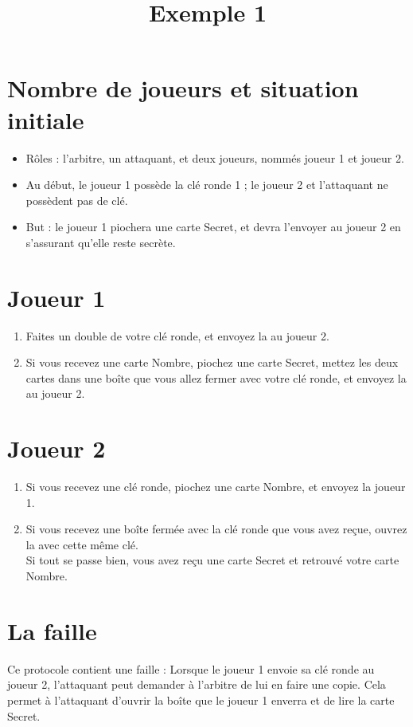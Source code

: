 \documentclass[a4paper,10pt]{article}
\title{Exemple 1}
\begin{document}
\maketitle

\section{Nombre de joueurs et situation initiale}
\begin{itemize}
	\item Rôles : l'arbitre, un attaquant, et deux joueurs, nommés joueur 1 et joueur 2.
	\item Au début, le joueur 1 possède la clé ronde 1 ; le joueur 2 et l'attaquant ne possèdent pas de clé.
	\item But : le joueur 1 piochera une carte Secret, et devra l'envoyer au joueur 2 en s'assurant qu'elle reste secrète.
\end{itemize}




\section{Joueur 1}
\begin{enumerate}
	\item Faites un double de votre clé ronde, et envoyez la au joueur 2.
	\item Si vous recevez une carte Nombre, piochez une carte Secret, mettez les deux cartes dans une boîte que vous allez fermer avec votre clé ronde, et envoyez la au joueur 2.
\end{enumerate}

\section{Joueur 2}
\begin{enumerate}
	\item Si vous recevez une clé ronde, piochez une carte Nombre, et envoyez la joueur 1.
	\item Si vous recevez une boîte fermée avec la clé ronde que vous avez reçue, ouvrez la avec cette même clé.\\ Si tout se passe bien, vous avez reçu une carte Secret et retrouvé votre carte Nombre.
\end{enumerate}

\section{La faille}
Ce protocole contient une faille :
Lorsque le joueur 1 envoie sa clé ronde au joueur 2, l'attaquant peut demander à l'arbitre de lui en faire une copie. Cela permet à l'attaquant d'ouvrir la boîte que le joueur 1 enverra et de lire la carte Secret.
\end{document}
